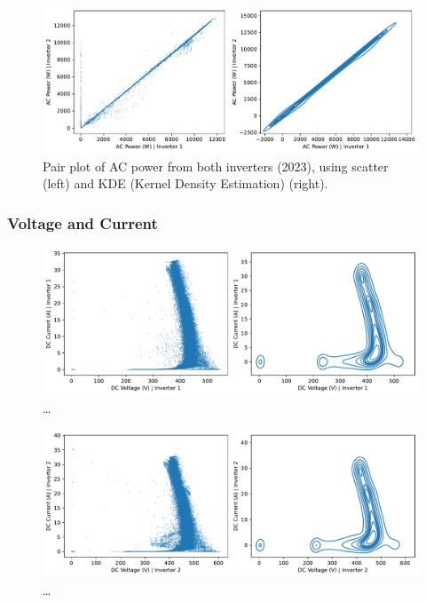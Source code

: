 
\begin{figure}[h!]
    \centering
    \includegraphics[width=\textwidth]{figures/chapter5/analysis/03_power_pairplots_test.pdf}
    \caption{Pair plot of AC power from both inverters (2023), using scatter (left) and KDE (Kernel Density Estimation) (right).}
    \label{fig:eda_power_test_pair}
\end{figure}


\subsubsection{Voltage and Current}

\begin{figure}[h!]
    \centering
    \includegraphics[width=\textwidth]{figures/chapter5/analysis/04_voltage_current_pairplot_kb_1.pdf}
    \caption{\dots}
    \label{fig:eda_volt_curr_pair_kb_1}
\end{figure}

\begin{figure}[h!]
    \centering
    \includegraphics[width=\textwidth]{figures/chapter5/analysis/06_voltage_current_pairplot_kb_2.pdf}
    \caption{\dots}
    \label{fig:eda_volt_curr_pair_kb_2}
\end{figure}


